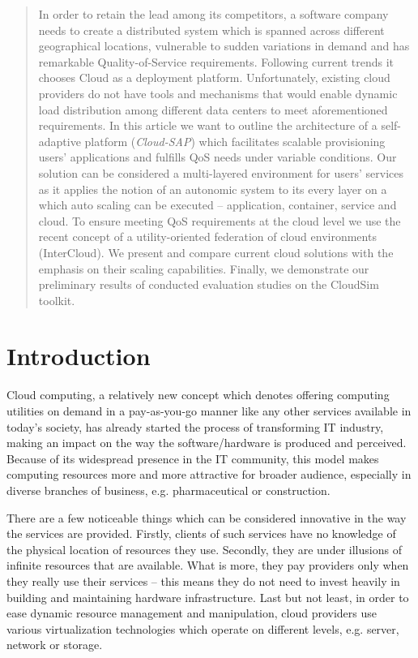 \documentclass[twocolumn]{svjour3}          %
\begin{document}
\begin{abstract}
In order to retain the lead among its competitors, a software company needs to create a distributed system which is spanned across different geographical locations, vulnerable to sudden variations in demand and has remarkable Quality-of-Service requirements. Following current trends it chooses Cloud as a deployment platform. Unfortunately, existing cloud providers do not have tools and mechanisms that would enable dynamic load distribution among different data centers to meet aforementioned requirements.
In this article we want to outline the architecture of a self-adaptive platform (\emph{Cloud-SAP}) which facilitates scalable provisioning users' applications and fulfills QoS needs under variable conditions. Our solution can be considered a multi-layered environment for users' services as it applies the notion of an autonomic system to its every layer on a which auto scaling can be executed -- application, container, service and cloud. To ensure meeting QoS requirements at the cloud level we use the recent concept of a utility-oriented federation of cloud environments (InterCloud).
We present and compare current cloud solutions with the emphasis on their scaling capabilities. Finally, we demonstrate our preliminary results of conducted evaluation studies on the CloudSim toolkit. 

\end{abstract}

\section{Introduction}
\label{intro}
Cloud computing, a relatively new concept which denotes offering computing utilities on demand in a pay-as-you-go manner like any other services available in today's society, has already started the process of transforming IT industry, making an impact on the way the software/hardware is produced and perceived. Because of its widespread presence in the IT community, this model makes computing resources more and more attractive for broader audience, especially in diverse branches of business, e.g. pharmaceutical or construction.

There are a few noticeable things which can be considered innovative in the way the services are provided. Firstly, clients of such services have no knowledge of the physical location of resources they use. Secondly, they are under illusions of infinite resources that are available. What is more, they pay providers only when they really use their services -- this means they do not need to invest heavily in building and maintaining hardware infrastructure. Last but not least, in order to ease dynamic resource management and manipulation, cloud providers use various virtualization technologies which operate on different levels, e.g. server, network or storage.
\end{document}
